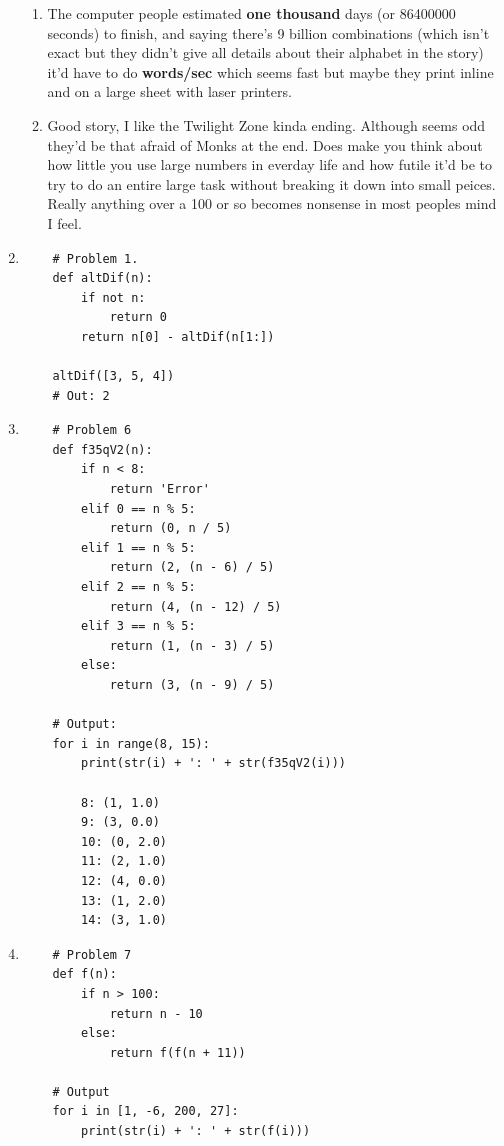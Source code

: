 \documentclass{article}
\begin{document}
\begin{enumerate}
\begin{enumerate}
    \item The computer people estimated \textbf{one thousand} days (or 86400000 seconds) to finish, and saying there's 9 billion combinations (which isn't exact but they didn't give all details about their alphabet in the story) it'd have to do  \textbf{words/sec} which seems fast but maybe they print inline and on a large sheet with laser printers. 
    \item Good story, I like the Twilight Zone kinda ending. Although seems odd they'd be that afraid of Monks at the end. Does make you think about how little you use large numbers in everday life and how futile it'd be to try to do an entire large task without breaking it down into small peices. Really anything over a 100 or so becomes nonsense in most peoples mind I feel.
  \end{enumerate}

  \item 
  \begin{lstlisting}
    # Problem 1.
    def altDif(n):
        if not n:
            return 0
        return n[0] - altDif(n[1:])

    altDif([3, 5, 4])
    # Out: 2
  \end{lstlisting}

  \item 
  \begin{lstlisting}
    # Problem 6
    def f35qV2(n):
        if n < 8:
            return 'Error'
        elif 0 == n % 5:
            return (0, n / 5)
        elif 1 == n % 5:
            return (2, (n - 6) / 5)
        elif 2 == n % 5:
            return (4, (n - 12) / 5)
        elif 3 == n % 5:
            return (1, (n - 3) / 5)    
        else:
            return (3, (n - 9) / 5)

    # Output:
    for i in range(8, 15):
        print(str(i) + ': ' + str(f35qV2(i)))

        8: (1, 1.0)
        9: (3, 0.0)
        10: (0, 2.0)
        11: (2, 1.0)
        12: (4, 0.0)
        13: (1, 2.0)
        14: (3, 1.0)   
  \end{lstlisting}

  \item 
  \begin{lstlisting}
    # Problem 7
    def f(n):
        if n > 100:
            return n - 10
        else:
            return f(f(n + 11))

    # Output
    for i in [1, -6, 200, 27]:
        print(str(i) + ': ' + str(f(i)))


\end{lstlisting}
\end{enumerate}
\end{document}
